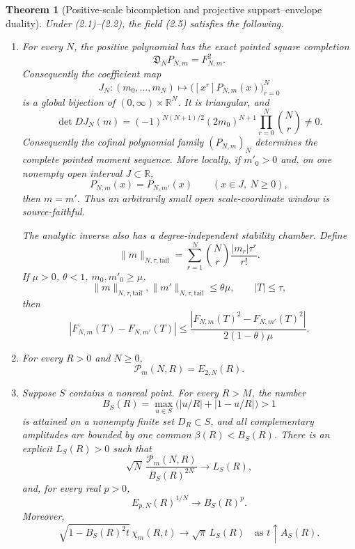 \documentclass[11pt]{article}
\newtheorem{theorem}{Theorem}[section]
\theoremstyle{remark}
\newcommand{\R}{\mathbb R}
\begin{document}
\begin{theorem}[Positive-scale bicompletion and projective support--envelope duality]
\label{thm:master}
Under \emph{(2.1)--(2.2)}, the field \emph{(2.5)} satisfies the following.

\begin{enumerate}
\item For every $N$, the positive polynomial has the exact pointed square completion
\begin{equation}
 \mathfrak D_NP_{N,m}=F_{N,m}^{2}.
 \tag{2.8a}
\end{equation}
Consequently the coefficient map
\[
 J_N:(m_0,\ldots,m_N)\longmapsto
 \bigl([x^r]P_{N,m}(x)\bigr)_{r=0}^N
\]
is a global bijection of $(0,\infty)\times\R^N$.  It is triangular, and
\begin{equation}
 \det DJ_N(m)=(-1)^{N(N+1)/2}(2m_0)^{N+1}
       \prod_{r=0}^N\binom Nr\ne0.
 \tag{2.8}
\end{equation}
Consequently the cofinal polynomial family $(P_{N,m})_N$ determines the complete pointed moment
sequence.  More locally, if $m'_0>0$ and, on one nonempty open interval $J\subset\R$,
\[
 P_{N,m}(x)=P_{N,m'}(x)\qquad(x\in J,\ N\ge0),
\]
then $m=m'$.  Thus an arbitrarily small open scale-coordinate window is source-faithful.

The analytic inverse also has a degree-independent stability chamber.  Define
\[
 \|m\|_{N,\tau,\mathrm{tail}}
 =\sum_{r=1}^N\binom Nr\frac{|m_r|\tau^r}{r!}.
\]
If $\mu>0$, $\theta<1$, $m_0,m'_0\ge\mu$,
\[
 \|m\|_{N,\tau,\mathrm{tail}},
 \|m'\|_{N,\tau,\mathrm{tail}}\le\theta\mu,
 \qquad |T|\le\tau,
\]
then
\begin{equation}
 |F_{N,m}(T)-F_{N,m'}(T)|
 \le
 \frac{|F_{N,m}(T)^2-F_{N,m'}(T)^2|}
 {2(1-\theta)\mu}.
 \tag{2.8b}
\end{equation}

\item For every $R>0$ and $N\ge0$,
\begin{equation}
 \mathcal P_m(N,R)=E_{2,N}(R).
 \tag{2.9}
\end{equation}

\item Suppose $S$ contains a nonreal point.  For every $R>M$, the number
\begin{equation}
 B_S(R)=\max_{u\in S}\bigl(|u/R|+|1-u/R|\bigr)>1
 \tag{2.10}
\end{equation}
is attained on a nonempty finite set $D_R\subset S$, and all complementary amplitudes are
bounded by one common $\beta(R)<B_S(R)$.  There is an explicit $L_S(R)>0$ such that
\begin{equation}
 \sqrt N\,\frac{\mathcal P_m(N,R)}{B_S(R)^{2N}}
 \longrightarrow L_S(R),
 \tag{2.11}
\end{equation}
and, for every real $p>0$,
\begin{equation}
 E_{p,N}(R)^{1/N}\longrightarrow B_S(R)^p.
 \tag{2.12}
\end{equation}
Moreover,
\begin{equation}
 \sqrt{1-B_S(R)^2t}\,\chi_m(R,t)
 \longrightarrow\sqrt\pi\,L_S(R)
 \quad\text{as }t\uparrow A_S(R).
 \tag{2.13}
\end{equation}


\end{enumerate}
\end{theorem}
\end{document}
